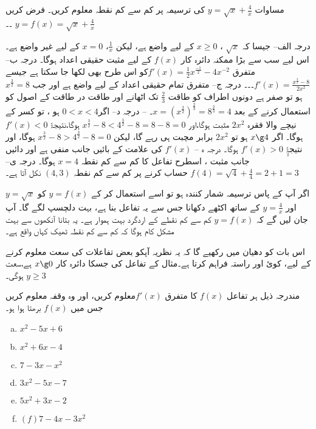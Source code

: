 مساوات \( y=\sqrt{x}+\frac{4}{x} \) کی ترسیمہ پر کم سے کم نقطہ معلوم کریں۔
فرض کریں \( y=f(x)=\sqrt{x}+\frac{4}{x} \)		۔۔

درجہ الف-- جیسا کہ $ \sqrt{x}$		،	  $ x\geq0$	کے لیے واضع ہے، لیکن 	$ \frac{1}{x} $،	  $x=0 $	کے لیے غیر واضع ہے۔ اس لیے سب سے بڑا ممکنہ دائرہ کار 	   \(f(x)\)   	کے لیے مثبت حقیقی اعداد ہوگا۔
درجہ ب--متفرق	$ f'(x)=\frac{1}{2} x^{\frac{-1}{2}} -4x^{-2}$کو اس طرح بھی لکھا جا سکتا ہے جیسے  $f'(x)=\frac{x^{\frac{3}{2}}-8}{2x^{2}} $۔۔۔
درجہ ج-- متفرق تمام حقیقی اعداد کے لیے واضع ہے اور جب $ x^{\frac{3}{2}}=8 $ ہو تو صفر ہے دونوں اطراف کو طاقت  $\frac{2}{3} $		 تک اٹھانے اور طاقت در طاقت کے اصول کو استعمال کرنے کے بعد    $ x=(x^{\frac{3}{2}})^{\frac{2}{3}}=8^{\frac{2}{3}}=4 $۔
--
درجہ د-- اگر$ 0<x<4 $ ہو ، تو کسر کے نیچے والا فقرہ 	   $2x^{2} $	مثبت ہوگا،اور    $x^{\frac{3}{2}}-8<4^{\frac{3}{2}}-8=8-8=0 $   ہوگا،نتیجۃً	 $f'(x)<0 $	ہوگا۔ 
اگر 	\( x\g 4\) ہو تو 	$2x^{2} $ برابر مچبت ہی رہے گا، لیکن $x^{\frac{3}{2}}-8>4^{\frac{3}{2}}-8=0 $ ہوگا، اور نتیجۃًٍٍ \( f'(x)>0 \) ہوگا۔
درجہ ہ --  \(f\prime(x)\) کی علامت   کے بائیں جانب منفی ہے اور دائیں جانب مثبت ، اسطرح تفاعل کا کم سے کم نقطہ $ x=4 $  ہوگا۔
درجہ ی-- 		 $ f(4)=\sqrt{4}+\frac{4}{4}=2+1=3 $	حساب کرنے پر کم سے کم نقطہ 	\(  (4,3)\)	 نکل آتا ہے۔

اگر آپ کے پاس ترسیمہ شمار کنندہ ہو تو اسے استعمال کر کے \(y=f(x) \) کو  \(y=\sqrt{x} \) اور  \(y=\frac{4}{x} \)  کے ساتھ اکٹھے دکھانا جس سے یہ تفاعل بنا ہے، بہت دلچسپ لگے گا۔ آپ جان لیں گے کہ \(y=f(x) \)  کم سے کم نقطے کے اردگرد بہت ہموار ہے۔ یہ بتانا آنکھوں سے بہت مشکل کام ہوگا کہ کم سے کم نقطہ ٹھیک کہاں واقع ہے۔

اس بات کو دھیان میں رکھیے گا کہ یہ نظریہ آپکو بعض تفاعلات کی سعت معلوم کرنے کے لیے، کوئ اور راستہ فراہم کرتا ہے۔مثال  کے تفاعل کی جسکا دائرہ کار 	\( x\g 0\)	 ہے،سعت 	\( y\ge 3\) ہوگی۔

مندرجہ ذیل ہر تفاعل 	\(f(x)\) 	کا متفرق \( f\prime (x)\)معلوم کریں، اور وہ وقفہ معلوم کریں جس میں 		  \(f(x)\)   برھتا ہوا ہو۔ 
\begin{multicols}{3}
\begin{enumerate}[a.]
\item \(x^{2}-5x+6 \hspace{50pt}\)
\item  \(x^{2}+6x-4 \hspace{50pt}\)
\item   \(7-3x-x^{2} \)
\item    \(3x^{2}-5x-7 \hspace{50pt}\)
\item     \(5x^{2}+3x-2 \hspace{50pt}\)
\item      \((f)7-4x-3x^{2}\)
\end{enumerate}
\end{multicols}

